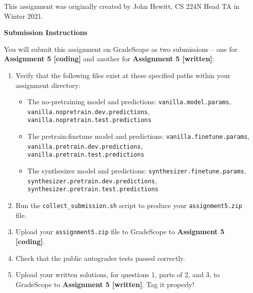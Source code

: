 \documentclass[answers]{exam}
\begin{document}
This assignment was originally created by John Hewitt, CS 224N Head TA in Winter 2021.



\newpage

\begin{questions}
   
   
\end{questions}

\Large{\textbf{Submission Instructions}}

\normalsize
You will submit this assignment on GradeScope as two submissions -- one for \textbf{Assignment 5 [coding]} and another for \textbf{Assignment 5 [written]}:
\begin{enumerate}
    \item Verify that the following files exist at these specified paths within your assignment directory:
        \begin{itemize}
            \item The no-pretraining model and predictions: \texttt{vanilla.model.params}, \texttt{vanilla.nopretrain.dev.predictions},\\\texttt{vanilla.nopretrain.test.predictions}
            \item The pretrain-finetune model and predictions: \texttt{vanilla.finetune.params}, \texttt{vanilla.pretrain.dev.predictions}, \\ \texttt{vanilla.pretrain.test.predictions}
            \item The synthesizer model and predictions: \texttt{synthesizer.finetune.params}, \texttt{synthesizer.pretrain.dev.predictions}, \\ \texttt{synthesizer.pretrain.test.predictions}
        \end{itemize}

    \item Run the \texttt{collect\_submission.sh} script to produce your \texttt{assignment5.zip} file.
    \item Upload your \texttt{assignment5.zip} file to GradeScope to \textbf{Assignment 5 [coding]}.
    \item Check that the public autograder tests passed correctly.
    \item Upload your written solutions, for questions 1, parts of 2, and 3, to GradeScope to \textbf{Assignment 5 [written]}. Tag it properly!
\end{enumerate}



\end{document}
